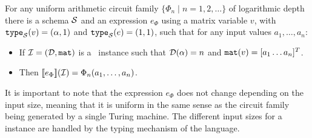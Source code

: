 
\begin{theorem}
\label{th-circuits-ml}
For any uniform arithmetic circuit family $\{\Phi_n\mid n=1,2,\ldots\}$ of logarithmic depth there is a \langfor schema $\mathcal{S}$ and an expression $e_\Phi$ using a matrix variable $v$, with $\texttt{type}_{\mathcal{S}}(v)=(\alpha,1)$ and $\texttt{type}_{\mathcal{S}}(e) = (1,1)$, such that for any input values $a_1,\ldots ,a_n$: 
\begin{itemize}
\item If $\mathcal{I} = (\mathcal{D},\texttt{mat})$ is a \lang\ instance such that $\mathcal{D}(\alpha) = n$ and $\texttt{mat}(v) = [a_1 \ldots a_n]^T$.
\item Then $\llbracket e_\Phi \rrbracket(\mathcal{I}) = \Phi_n(a_1,\ldots ,a_n)$.
\end{itemize}
\end{theorem}
It is important to note that the expression $e_\Phi$ does not change depending on the input size, meaning that it is uniform in the same sense as the circuit family being generated by a single Turing machine. The different input sizes for a \langfor instance are handled by the typing mechanism of the language. 

